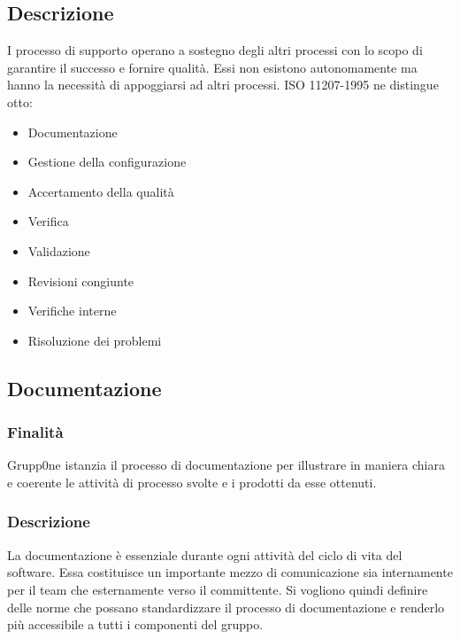 \documentclass[../norme-di-progetto.tex]{subfiles}
\begin{document}
\subsection{Descrizione}%
\label{sub:processi di supporto/descrizione}

I processo di supporto operano a sostegno degli altri processi con lo scopo di garantire il successo e fornire qualità. Essi non esistono autonomamente ma hanno la necessità di appoggiarsi ad altri processi. ISO 11207-1995 ne distingue otto:

\begin{itemize}
  \item Documentazione
  \item Gestione della configurazione
  \item Accertamento della qualità
  \item Verifica
  \item Validazione
  \item Revisioni congiunte
  \item Verifiche interne
  \item Risoluzione dei problemi
\end{itemize}

\subsection{Documentazione}%
\label{sub:documentazione}

\subsubsection{Finalità}%
\label{subs:documentazione/finalita}

Grupp0ne istanzia il processo di documentazione per illustrare in maniera chiara e coerente le attività di processo svolte e i prodotti da esse ottenuti.

\subsubsection{Descrizione}%
\label{subs:documentazione/descrizione}

La documentazione è essenziale durante ogni attività del ciclo di vita del software.
Essa costituisce un importante mezzo di comunicazione sia internamente per il team che esternamente verso il committente.
Si vogliono quindi definire delle norme che possano standardizzare il processo di documentazione e renderlo più accessibile a tutti i componenti del gruppo.
\end{document}
